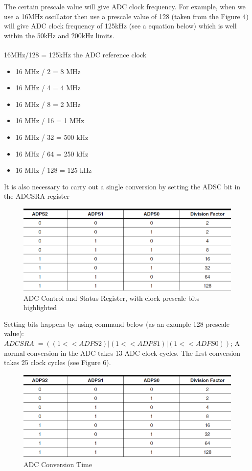 \documentclass[english]{article}
\begin{document}
The certain prescale value will give ADC clock frequency. For example, when we use a 16MHz oscillator then use a prescale value of 128 (taken from the Figure 4) will give ADC clock frequency of 125kHz (see a equation below) which is well within the 50kHz and 200kHz limits.\\\\
16MHz/128 = 125kHz the ADC reference clock
\begin{itemize}
\item 16 MHz / 2 = 8 MHz
\item 16 MHz / 4 = 4 MHz
\item 16 MHz / 8 = 2 MHz
\item 16 MHz / 16 = 1 MHz
\item 16 MHz / 32 = 500 kHz
\item 16 MHz / 64 = 250 kHz
\item 16 MHz / 128 = 125 kHz
\end{itemize}
It is also necessary to carry out a single conversion by setting the ADSC bit in the ADCSRA register \begin{figure}[H]
\centerline{\includegraphics[scale=0.8]{MicroLab8/4}}
\caption{ADC Control and Status Register, with clock prescale bits highlighted}
\end{figure}
Setting bits happens by using command below (as an example 128 prescale value):
$ADCSRA |= ((1<<ADPS2) | (1<<ADPS1) | (1<<ADPS0))$;
A normal conversion in the ADC takes 13 ADC clock cycles. The first conversion takes 25 clock cycles (see Figure 6).
\begin{figure}[H]
\centerline{\includegraphics[scale=0.8]{MicroLab8/4}}
\caption{ADC Conversion Time}
\end{figure}
\end{document}

